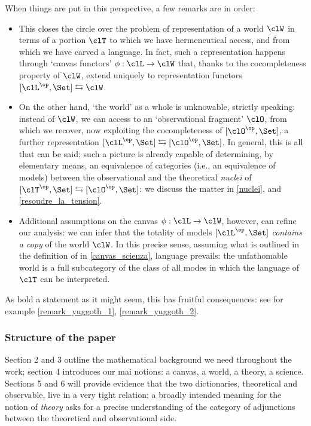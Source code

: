 When things are put in this perspective, a few remarks are in order: 
\begin{itemize}
	\item This closes the circle over the problem of representation of a world $\clW$ in terms of a portion $\clT$ to which we have hermeneutical access, and from which we have carved a language. In fact, such a representation happens through `canvas functors' $\phi : \clL \to \clW$ that, thanks to the cocompleteness property of $\clW$, extend uniquely to representation functors $[\clL^\op,\Set] \leftrightarrows \clW$. 
	\item On the other hand, `the world' as a whole is unknowable, strictly speaking: instead of $\clW$, we can access to an `observational fragment' $\clO$, from which we recover, now exploiting the cocompleteness of $[\clO^\op,\Set]$, a further representation $[\clL^\op,\Set] \leftrightarrows [\clO^\op,\Set]$. In general, this is all that can be said; such a picture is already capable of determining, by elementary means, an equivalence of categories (i.e., an equivalence of models) between the observational and the theoretical \emph{nuclei} of $[\clT^\op,\Set] \leftrightarrows [\clO^\op,\Set]$: we discuss the matter in \autoref{nuclei}, and \autoref{resoudre_la_tension}.
	\item Additional assumptions on the canvas $\phi : \clL\to \clW$, however, can refine our analysis: we can infer that the totality of models $[\clL^\op,\Set]$ \emph{contains a copy} of the world $\clW$. In this precise sense, assuming what is outlined in the definition of \science in \autoref{canvas_scienza}, language prevails: the unfathomable world is a full subcategory of the class of all modes in which the language of $\clT$ can be interpreted. 
\end{itemize}
As bold a statement as it might seem, this has fruitful consequences: see for example \autoref{remark_yuggoth_1}, \autoref{remark_yuggoth_2}.
\subsubsection*{Structure of the paper}
Section 2 and 3 outline the mathematical background we need throughout the work; section 4 introduces our mai notions: a canvas, a world, a theory, a science. Sections 5 and 6 will provide evidence that the two dictionaries, theoretical and observable, live in a very tight relation; a broadly intended meaning for the notion of \emph{theory} asks for a precise understanding of the category of adjunctions between the theoretical and observational side.